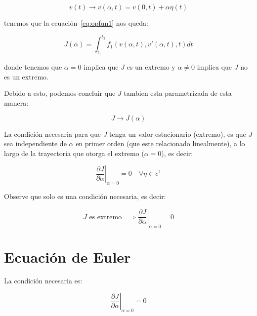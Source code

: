     \begin{equation*}
        v(t) \to v(\alpha, t) = v(0, t) + \alpha \eta(t)
    \end{equation*}

    tenemos que la ecuación~\ref{eq:opfun1} nos queda:

    \begin{equation*}
        J(\alpha) = \int_{t_1}^{t_2} f_1(v(\alpha, t), v'(\alpha, t), t) dt
    \end{equation*}

    donde tenemos que $\alpha = 0$ implica que $J$ es un extremo y $\alpha \ne 0$ implica que $J$ no es un extremo.

    Debido a esto, podemos concluir que $J$ tambien esta parametrizada de esta manera:

    \begin{equation*}
        J \to J(\alpha)
    \end{equation*}

    La condición necesaria para que $J$ tenga un valor estacionario (extremo), es que $J$ sea independiente de $\alpha$ en primer orden (que este relacionado linealmente), a lo largo de la trayectoria que otorga el extremo ($\alpha = 0$), es decir:

    \begin{equation}
        \left. \frac{\partial J}{\partial \alpha} \right|_{\alpha=0} = 0 \quad \forall \eta \in e^1
    \end{equation}

    \begin{nota}
        Observe que solo es una condición necesaria, es decir:

        \begin{equation*}
            J \text{ es extremo } \implies \left. \frac{\partial J}{\partial \alpha} \right|_{\alpha=0} = 0
        \end{equation*}
    \end{nota}

    \newpage
    \section{Ecuación de Euler}

        La condición necesaria es:

        \begin{equation*}
            \left. \frac{\partial J}{\partial \alpha} \right|_{\alpha=0} = 0
        \end{equation*}

